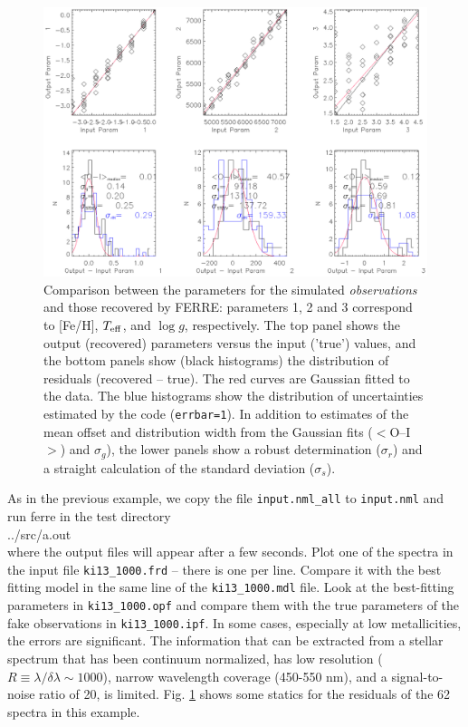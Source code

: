 \documentclass[12pt]{article}
\begin{document}
\begin{figure}[t!]
\includegraphics[width=14cm]{f1.ps}
\caption{Comparison between the parameters for the simulated {\it observations}
and those recovered by FERRE: parameters  1, 2 and  3 correspond to [Fe/H], 
$T_{\rm eff}$, and $\log g$, respectively. 
The top panel shows the output (recovered) %
parameters versus the input ('true') values, and the bottom panels show (black 
histograms) the distribution of residuals (recovered -- true). The red curves  
are Gaussian fitted to the data. The blue histograms show the distribution of 
uncertainties estimated by the code ({\tt errbar=1}). In addition to estimates 
of the mean offset and distribution width from the Gaussian fits ($<$O--I$>$) 
and $\sigma_g$), the lower panels show a robust determination ($\sigma_r$) and 
a straight calculation of the standard deviation ($\sigma_{s}$).
\label{f1}
}
\end{figure}

As in the previous example, we copy the file {\tt input.nml\_all} to {\tt input.nml} 
and run ferre in the test directory \\
../src/a.out \\
where the output files will appear after a few seconds. Plot one of the spectra
in the input file {\tt ki13\_1000.frd} -- there is one per line. Compare it with 
the best fitting model in the same line of the {\tt ki13\_1000.mdl} file. 
Look at  the best-fitting parameters in {\tt ki13\_1000.opf} and compare 
them with the true parameters of the fake observations in {\tt ki13\_1000.ipf}. 
In some cases, especially at low metallicities, the errors are significant.
The information that can be extracted from a stellar spectrum that has  been 
continuum normalized, has low resolution ($R\equiv \lambda/\delta\lambda \sim 1000$), 
narrow wavelength coverage (450-550 nm), and a signal-to-noise ratio of 20, is limited. 
Fig. \ref{f1} shows some statics for the residuals of the
62 spectra in this example.
\end{document}
